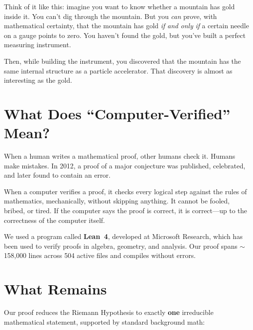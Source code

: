 \documentclass[11pt,a4paper]{article}
\begin{document}
Think of it like this: imagine you want to know whether a mountain
has gold inside it. You can't dig through the mountain. But you
\emph{can} prove, with mathematical certainty, that the mountain
has gold \emph{if and only if} a certain needle on a gauge points
to zero. You haven't found the gold, but you've built a perfect
measuring instrument.

Then, while building the instrument, you discovered that the
mountain has the same internal structure as a particle
accelerator. That discovery is almost as interesting as the
gold.

\section{What Does ``Computer-Verified'' Mean?}

When a human writes a mathematical proof, other humans check it.
Humans make mistakes. In 2012, a proof of a major conjecture was
published, celebrated, and later found to contain an error.

When a computer verifies a proof, it checks every logical step
against the rules of mathematics, mechanically, without skipping
anything. It cannot be fooled, bribed, or tired. If the computer
says the proof is correct, it is correct---up to the correctness
of the computer itself.

We used a program called \textbf{Lean~4}, developed at Microsoft
Research, which has been used to verify proofs in algebra, geometry,
and analysis. Our proof spans $\sim$158{,}000 lines across 504 active
files and compiles without errors.

\section{What Remains}

Our proof reduces the Riemann Hypothesis to exactly \textbf{one}
irreducible mathematical statement, supported by standard
background math:
\end{document}

